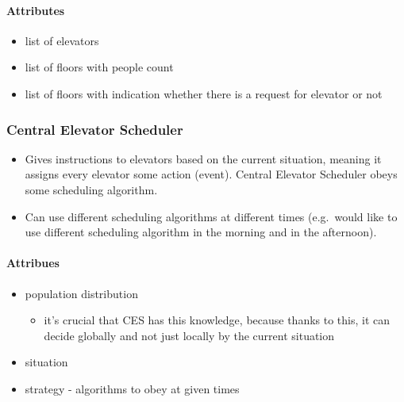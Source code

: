 \hypertarget{attributes-2}{%
\paragraph{Attributes}\label{attributes-2}}

\begin{itemize}
\tightlist
\item
  list of elevators
\item
  list of floors with people count
\item
  list of floors with indication whether there is a request for elevator
  or not
\end{itemize}

\hypertarget{central-elevator-scheduler}{%
\subsubsection{\texorpdfstring{\textbf{Central Elevator
Scheduler}}{Central Elevator Scheduler}}\label{central-elevator-scheduler}}

\begin{itemize}
\tightlist
\item
  Gives instructions to elevators based on the current situation,
  meaning it assigns every elevator some action (event). Central
  Elevator Scheduler obeys some scheduling algorithm.
\item
  Can use different scheduling algorithms at different times (e.g.~would
  like to use different scheduling algorithm in the morning and in the
  afternoon).
\end{itemize}

\hypertarget{attribues-1}{%
\paragraph{Attribues}\label{attribues-1}}

\begin{itemize}
\tightlist
\item
  population distribution

  \begin{itemize}
  \tightlist
  \item
    it's crucial that CES has this knowledge, because thanks to this, it
    can decide globally and not just locally by the current situation
  \end{itemize}
\item
  situation
\item
  strategy - algorithms to obey at given times
\end{itemize}


